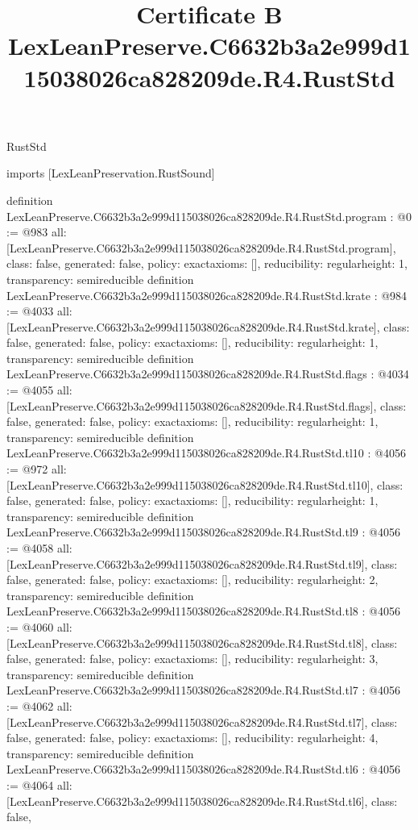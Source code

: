 \begin{lexlean}{RustStd}
\title{Certificate B LexLeanPreserve.C6632b3a2e999d115038026ca828209de.R4.RustStd}
\begin{coremodule}
imports [LexLeanPreservation.RustSound]

definition LexLeanPreserve.C6632b3a2e999d115038026ca828209de.R4.RustStd.program : @0 := @983 {
  all: [LexLeanPreserve.C6632b3a2e999d115038026ca828209de.R4.RustStd.program],
  class: false,
  generated: false,
  policy: exact{axioms: []},
  reducibility: regular{height: 1},
  transparency: semireducible
}
definition LexLeanPreserve.C6632b3a2e999d115038026ca828209de.R4.RustStd.krate : @984 := @4033 {
  all: [LexLeanPreserve.C6632b3a2e999d115038026ca828209de.R4.RustStd.krate],
  class: false,
  generated: false,
  policy: exact{axioms: []},
  reducibility: regular{height: 1},
  transparency: semireducible
}
definition LexLeanPreserve.C6632b3a2e999d115038026ca828209de.R4.RustStd.flags : @4034 := @4055 {
  all: [LexLeanPreserve.C6632b3a2e999d115038026ca828209de.R4.RustStd.flags],
  class: false,
  generated: false,
  policy: exact{axioms: []},
  reducibility: regular{height: 1},
  transparency: semireducible
}
definition LexLeanPreserve.C6632b3a2e999d115038026ca828209de.R4.RustStd.tl10 : @4056 := @972 {
  all: [LexLeanPreserve.C6632b3a2e999d115038026ca828209de.R4.RustStd.tl10],
  class: false,
  generated: false,
  policy: exact{axioms: []},
  reducibility: regular{height: 1},
  transparency: semireducible
}
definition LexLeanPreserve.C6632b3a2e999d115038026ca828209de.R4.RustStd.tl9 : @4056 := @4058 {
  all: [LexLeanPreserve.C6632b3a2e999d115038026ca828209de.R4.RustStd.tl9],
  class: false,
  generated: false,
  policy: exact{axioms: []},
  reducibility: regular{height: 2},
  transparency: semireducible
}
definition LexLeanPreserve.C6632b3a2e999d115038026ca828209de.R4.RustStd.tl8 : @4056 := @4060 {
  all: [LexLeanPreserve.C6632b3a2e999d115038026ca828209de.R4.RustStd.tl8],
  class: false,
  generated: false,
  policy: exact{axioms: []},
  reducibility: regular{height: 3},
  transparency: semireducible
}
definition LexLeanPreserve.C6632b3a2e999d115038026ca828209de.R4.RustStd.tl7 : @4056 := @4062 {
  all: [LexLeanPreserve.C6632b3a2e999d115038026ca828209de.R4.RustStd.tl7],
  class: false,
  generated: false,
  policy: exact{axioms: []},
  reducibility: regular{height: 4},
  transparency: semireducible
}
definition LexLeanPreserve.C6632b3a2e999d115038026ca828209de.R4.RustStd.tl6 : @4056 := @4064 {
  all: [LexLeanPreserve.C6632b3a2e999d115038026ca828209de.R4.RustStd.tl6],
  class: false,
}
\end{coremodule}
\end{lexlean}
